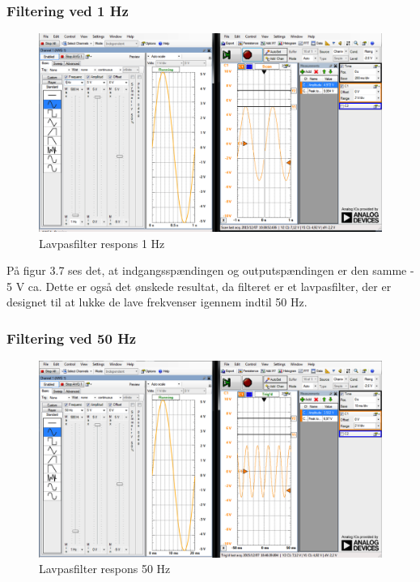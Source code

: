 \subsubsection{Filtering ved 1 Hz}
\begin{figure}[H]
	\centering
	\includegraphics[width=1\textwidth]{Figurer/Snip20151207_39}
	\caption{Lavpasfilter respons 1 Hz}
	\label{fig:Filter}
\end{figure}

På figur 3.7 ses det, at indgangsspændingen  og outputspændingen er den samme - 5 V ca. Dette er også det ønskede resultat, da filteret er et lavpasfilter, der er designet til at lukke de lave frekvenser igennem indtil 50 Hz. 
 
\subsubsection{Filtering ved 50 Hz}
\begin{figure}[H]
	\centering
	\includegraphics[width=1\textwidth]{Figurer/Snip20151207_40}
	\caption{Lavpasfilter respons 50 Hz}
	\label{fig:Filter}
\end{figure}

